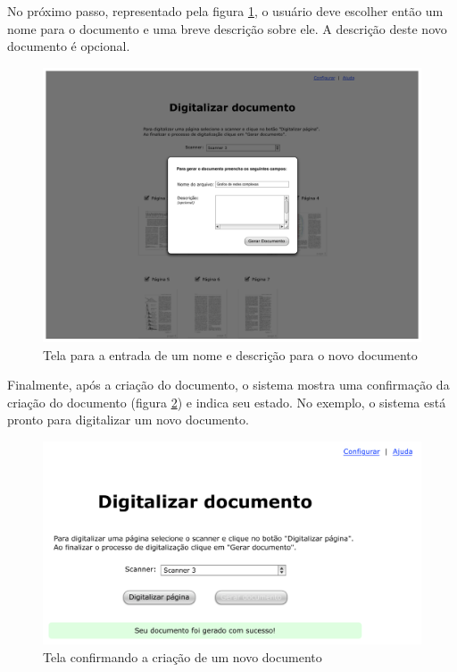 No próximo passo, representado pela figura \ref{fig:dig_6}, o usuário deve escolher então um nome para o documento e uma breve descrição sobre ele. A descrição deste novo documento é opcional.

\begin{figure}[h]
 \centering
  \includegraphics[scale=0.4]{img/mockups/digitalizacao-6.pdf}
  \caption {Tela para a entrada de um nome e descrição para o novo documento}
  \label{fig:dig_6}
\end{figure}

Finalmente, após a criação do documento, o sistema mostra uma confirmação da criação do documento (figura \ref{fig:dig_7}) e indica seu estado. No exemplo, o sistema está pronto para digitalizar um novo documento.

\begin{figure}[h]
 \centering
  \includegraphics[scale=0.6]{img/mockups/digitalizacao-7.pdf}
  \caption {Tela confirmando a criação de um novo documento}
  \label{fig:dig_7}
\end{figure}

